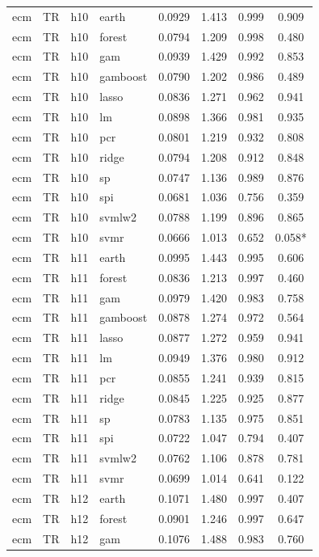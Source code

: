 \begin{ThreePartTable}
\begin{longtable}[t]{llclcccc}
\addlinespace
ecm & TR & h10 & earth & 0.0929 & 1.413 & 0.999 & 0.909\\
ecm & TR & h10 & forest & 0.0794 & 1.209 & 0.998 & 0.480\\
ecm & TR & h10 & gam & 0.0939 & 1.429 & 0.992 & 0.853\\
ecm & TR & h10 & gamboost & 0.0790 & 1.202 & 0.986 & 0.489\\
ecm & TR & h10 & lasso & 0.0836 & 1.271 & 0.962 & 0.941\\
ecm & TR & h10 & lm & 0.0898 & 1.366 & 0.981 & 0.935\\
ecm & TR & h10 & pcr & 0.0801 & 1.219 & 0.932 & 0.808\\
ecm & TR & h10 & ridge & 0.0794 & 1.208 & 0.912 & 0.848\\
ecm & TR & h10 & sp & 0.0747 & 1.136 & 0.989 & 0.876\\
ecm & TR & h10 & spi & 0.0681 & 1.036 & 0.756 & 0.359\\
ecm & TR & h10 & svmlw2 & 0.0788 & 1.199 & 0.896 & 0.865\\
ecm & TR & h10 & svmr & 0.0666 & 1.013 & 0.652 & 0.058*\\
\addlinespace
ecm & TR & h11 & earth & 0.0995 & 1.443 & 0.995 & 0.606\\
ecm & TR & h11 & forest & 0.0836 & 1.213 & 0.997 & 0.460\\
ecm & TR & h11 & gam & 0.0979 & 1.420 & 0.983 & 0.758\\
ecm & TR & h11 & gamboost & 0.0878 & 1.274 & 0.972 & 0.564\\
ecm & TR & h11 & lasso & 0.0877 & 1.272 & 0.959 & 0.941\\
ecm & TR & h11 & lm & 0.0949 & 1.376 & 0.980 & 0.912\\
ecm & TR & h11 & pcr & 0.0855 & 1.241 & 0.939 & 0.815\\
ecm & TR & h11 & ridge & 0.0845 & 1.225 & 0.925 & 0.877\\
ecm & TR & h11 & sp & 0.0783 & 1.135 & 0.975 & 0.851\\
ecm & TR & h11 & spi & 0.0722 & 1.047 & 0.794 & 0.407\\
ecm & TR & h11 & svmlw2 & 0.0762 & 1.106 & 0.878 & 0.781\\
ecm & TR & h11 & svmr & 0.0699 & 1.014 & 0.641 & 0.122\\
\addlinespace
ecm & TR & h12 & earth & 0.1071 & 1.480 & 0.997 & 0.407\\
ecm & TR & h12 & forest & 0.0901 & 1.246 & 0.997 & 0.647\\
ecm & TR & h12 & gam & 0.1076 & 1.488 & 0.983 & 0.760\\

\end{longtable}
\end{ThreePartTable}
